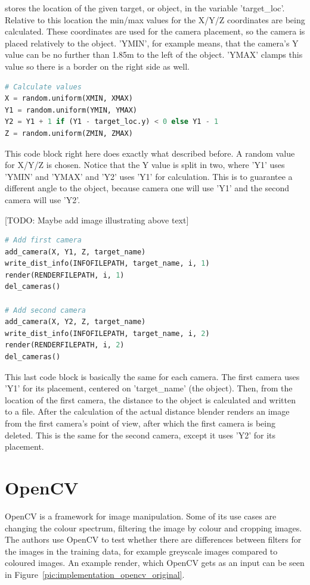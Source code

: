 stores the location of the given target, or object, in the variable 'target\_loc'. Relative to this location the min/max values for the X/Y/Z coordinates are being calculated. These coordinates are used for the camera placement, so the camera is placed relatively to the object. 'YMIN', for example means, that the camera's Y value can be no further than 1.85m to the left of the object. 'YMAX' clamps this value so there is a border on the right side as well.

\begin{lstlisting}[language=python]
# Calculate values
X = random.uniform(XMIN, XMAX)
Y1 = random.uniform(YMIN, YMAX)
Y2 = Y1 + 1 if (Y1 - target_loc.y) < 0 else Y1 - 1
Z = random.uniform(ZMIN, ZMAX)
\end{lstlisting}

This code block right here does exactly what described before. A random value for X/Y/Z is chosen. Notice that the Y value is split in two, where 'Y1' uses 'YMIN' and 'YMAX' and 'Y2' uses 'Y1' for calculation. This is to guarantee a different angle to the object, because camera one will use 'Y1' and the second camera will use 'Y2'.

[TODO: Maybe add image illustrating above text]

\begin{lstlisting}[language=python]
# Add first camera
add_camera(X, Y1, Z, target_name)
write_dist_info(INFOFILEPATH, target_name, i, 1)
render(RENDERFILEPATH, i, 1)
del_cameras()

# Add second camera
add_camera(X, Y2, Z, target_name)
write_dist_info(INFOFILEPATH, target_name, i, 2)
render(RENDERFILEPATH, i, 2)
del_cameras()
\end{lstlisting}

This last code block is basically the same for each camera. The first camera uses 'Y1' for its placement, centered on 'target\_name' (the object). Then, from the location of the first camera, the distance to the object is calculated and written to a file. After the calculation of the actual distance blender renders an image from the first camera's point of view, after which the first camera is being deleted. This is the same for the second camera, except it uses 'Y2' for its placement.

\section{OpenCV}
OpenCV is a framework for image manipulation. Some of its use cases are changing the colour spectrum, filtering the image by colour and cropping images. The authors use OpenCV to test whether there are differences between filters for the images in the training data, for example greyscale images compared to coloured images. An example render, which OpenCV gets as an input can be seen in Figure~\ref{pic:implementation_opencv_original}.

